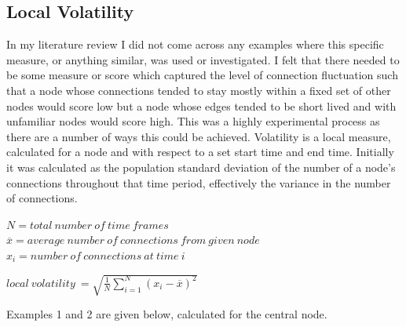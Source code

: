 
\subsection{Local Volatility}

In my literature review I did not come across any examples where this specific measure, or anything similar, was used or investigated. I felt that there needed to be some measure or score which captured the level of connection fluctuation such that a node whose connections tended to stay mostly within a fixed set of other nodes would score low but a node whose edges tended to be short lived and with unfamiliar nodes would score high. This was a highly experimental process as there are a number of ways this could be achieved.
Volatility is a local measure, calculated for a node and with respect to a set start time and end time. Initially it was calculated as the population standard deviation of the number of a node’s connections throughout that time period, effectively the variance in the number of connections.

\begin{center}
$N = total\ number\ of\ time\ frames$
$\overline{x} = average\ number\ of\ connections\ from\ given\ node $
$x_i = number\ of\ connections\ at\ time\ i$

$local\ volatility\ = \sqrt{\frac{1}{N} \sum_{i=1}^N (x_i - \overline{x})^2}$
\end{center}

Examples 1 and 2 are given below, calculated for the central node.



